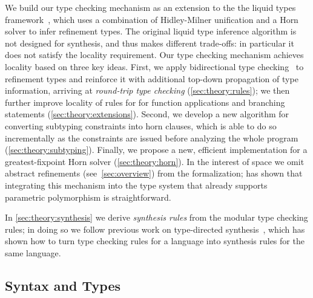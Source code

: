 \documentclass[10pt,preprint]{sigplanconf-pldi16}
\theoremstyle{definition}
\begin{document}
We build our type checking mechanism as an extension to the the liquid types framework~\cite{RondonKaJh08,KawaguchiRoJh09}, 
which uses a combination of Hidley-Milner unification and a Horn solver to infer refinement types.
The original liquid type inference algorithm is not designed for synthesis, 
and thus makes different trade-offs:
in particular it does not satisfy the locality requirement.
Our type checking mechanism achieves locality based on three key ideas.
First, we apply bidirectional type checking~\cite{PierceTu00} to refinement types
and reinforce it with additional top-down propagation of type information,
arriving at \emph{round-trip type checking} (\autoref{sec:theory:rules});
we then further improve locality of rules for for function applications and branching statements (\autoref{sec:theory:extensions}).
Second, we develop a new algorithm for converting subtyping constraints into horn clauses, 
which is able to do so incrementally as the constraints are issued before analyzing the whole program (\autoref{sec:theory:subtyping}).
Finally, we propose a new, efficient implementation for a greatest-fixpoint Horn solver (\autoref{sec:theory:horn}).
In the interest of space we omit abstract refinements (see~\autoref{sec:overview}) from the formalization;
\cite{VazouRoJh13} has shown that integrating this mechanism into the type system that already supports parametric polymorphism is straightforward.

In \autoref{sec:theory:synthesis} we derive \emph{synthesis rules} from the modular type checking rules;
in doing so we follow previous work on type-directed synthesis~\cite{OseraZd15,InalaQLS15},
which has shown how to turn type checking rules for a language into synthesis rules for the same language.


\subsection{Syntax and Types}\label{sec:theory:syntax}
\end{document}
